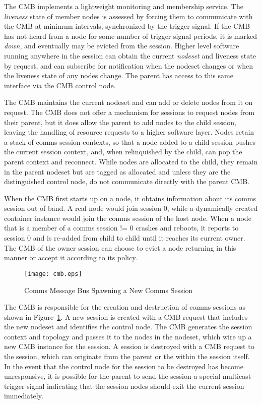The CMB implements a lightweight monitoring and membership service.
The {\em liveness} state of member nodes is assessed by forcing
them to communicate with the CMB at minimum intervals,
synchronized by the trigger signal.
If the CMB has not heard from a node for some number
of trigger signal periods, it is marked {\em down}, and eventually may
be evicted from the session.  Higher level software running anywhere in
the session can obtain the current {\em nodeset} and liveness state
by request, and can subscribe for notification when the nodeset changes
or when the liveness state of any nodes change.
The parent has access to this same interface via the CMB control node.

The CMB maintains the current nodeset and can add or delete nodes
from it on request.  The CMB does not offer a mechanism for sessions
to request nodes from their parent, but it does allow the parent
to add nodes to the child session, leaving the handling of resource
requests to a higher software layer.  Nodes retain a stack of comms
session contexts, so that a node added to a child session pushes the current
session context, and, when relinquished by the child, can pop the parent
context and reconnect.
While nodes are allocated to the child, they remain in the parent nodeset
but are tagged as allocated and unless they are the distinguished control
node, do not communicate directly with the parent CMB.

When the CMB first starts up on a node, it obtains information about its
comms session out of band.
A real node would join session 0, while a dynamically created
container instance would join the comms session of the host node.
When a node that is a member of a comms session != 0 crashes and
reboots, it reports to session 0 and is re-added from child to
child until it reaches its current owner.  The CMB of the owner session
can choose to evict a node returning in this manner or accept it
according to its policy.

\begin{figure}
\centering
\texttt{[image: cmb.eps]}
\caption{Comms Message Bus Spawning a New Comms Session}
\label{FigCMBSpawn}
\end{figure}

The CMB is responsible for the creation and destruction of
comms sessions as shown in Figure~\ref{FigCMBSpawn}.
A new session is created with a CMB request that
includes the new nodeset and identifies the control node.  The CMB
generates the session context and topology and passes it to the nodes
in the nodeset, which wire up a new CMB instance for the session.
A session is destroyed with a CMB request to the session,
which can originate from the parent or the within the session itself.
In the event that the control node for the session to be destroyed has become
unresponsive, it is possible for the parent to send the session a
special multicast trigger signal indicating that the session nodes
should exit the current session immediately.

